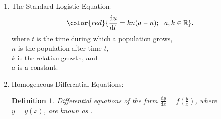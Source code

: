 \documentclass[12pt, a4paper]{article}
\newtheorem{definition}{Definition}[subsection]
\newtheorem{example}{Example}[subsection]
\def\R{{\mathbb{R}}}
\def\d{{\mathrm{d}}}
\begin{document}
\begin{enumerate}
\begin{itemize}
$$\begin{aligned}
            \int \frac{\d y}{h(y)}&=\int g(x)\ \d x
        \end{aligned}$$
        \item Solving differential equations using separation of variables: 
        \begin{enumerate}
            \item Separate the variables such that everything involving $y$ is on one side and everything involving $x$ is on the other side. 
            \item Integrate both sides and combine the constant of integration on one side of the equation (normally the right side).
        \end{enumerate}
        \begin{example}
            \textbf{Solve for $y$ if $\frac{\d y}{\d x}=x(1+y)e^x$.}
            $$\begin{aligned}
                \frac{\d y}{\d x}&=x(1+y)e^x\\
                \frac{1}{1+y}\d y&=xe^x\d x\\
                \int \frac{1}{1+y}\ \d y&=\int xe^x\ \d x\\
                {\color{green}{(=xe^x-\int e^x\ \d x}}&{\color{green}{=xe^x-e^x\ \text{[Integration by Parts]})}}\\
                \ln{|1+y|}&=xe^x-e^x+C\\
                1+y&=e^{xe^x-e^x+C}=e^{xe^x-e^x}\cdot e^C\\
                y&=Ae^{xe^x-e^x}-1\ \ \ (A=e^{C}).
            \end{aligned}$$
        \end{example}
    \end{itemize}
    \item The Standard Logistic Equation: 
    $${\color{red}{\frac{\d u}{\d t}=kn(a-n);\ \ a,k\in \R}}.$$
    where $t$ is the time during which a population grows, \\
        $n$ is the population after time $t$, \\
        $k$ is the relative growth, and \\
        $a$ is a constant. 
    \item Homogeneous Differential Equations: 
    \begin{definition}
        Differential equations of the form $\frac{\d y}{\d x}=f\left(\frac{y}{x}\right)$, where $y=y(x)$, are known as \textbf{\color{red}{homogeneous differential equations}}.
    \end{definition}

\end{enumerate}
\end{document}
